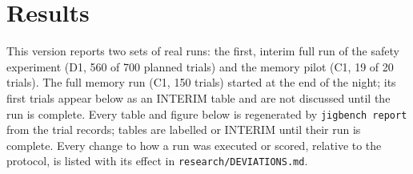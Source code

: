 \section{Results}
\label{sec:results}

This version reports two sets of real runs: the first, interim full run of the safety experiment (D1,
560 of 700 planned trials) and the memory pilot (C1, 19 of 20 trials). The full memory run (C1, 150
trials) started at the end of the night; its first trials appear below as an INTERIM table and are not
discussed until the run is complete. Every table and figure below is
regenerated by \texttt{jigbench report} from the trial records; tables are labelled \pilot{} or INTERIM
until their run is complete. Every change to how a run was executed or scored, relative to the protocol,
is listed with its effect in \texttt{research/DEVIATIONS.md}.






